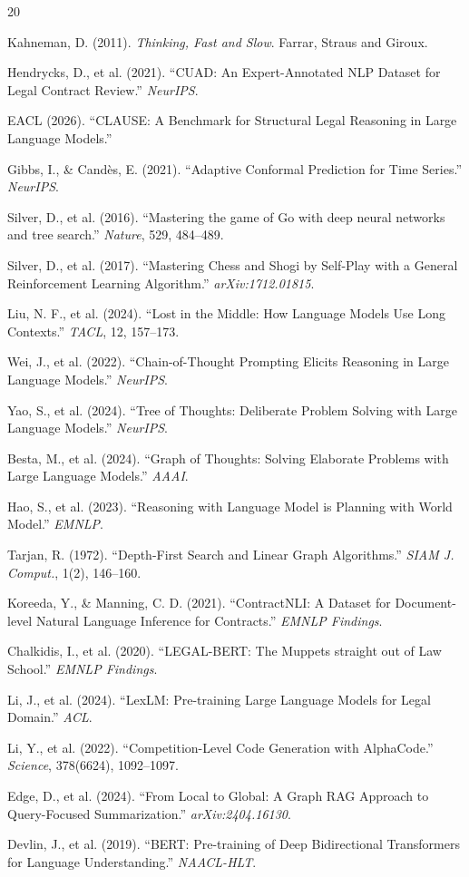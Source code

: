\documentclass{article}
\begin{document}

\begin{thebibliography}{20}

 Kahneman, D. (2011). \textit{Thinking, Fast and Slow}. Farrar, Straus and Giroux.

 Hendrycks, D., et al. (2021). ``CUAD: An Expert-Annotated NLP Dataset for Legal Contract Review.'' \textit{NeurIPS}.

 EACL (2026). ``CLAUSE: A Benchmark for Structural Legal Reasoning in Large Language Models.''

 Gibbs, I., \& Cand\`{e}s, E. (2021). ``Adaptive Conformal Prediction for Time Series.'' \textit{NeurIPS}.

 Silver, D., et al. (2016). ``Mastering the game of Go with deep neural networks and tree search.'' \textit{Nature}, 529, 484--489.

 Silver, D., et al. (2017). ``Mastering Chess and Shogi by Self-Play with a General Reinforcement Learning Algorithm.'' \textit{arXiv:1712.01815}.

 Liu, N. F., et al. (2024). ``Lost in the Middle: How Language Models Use Long Contexts.'' \textit{TACL}, 12, 157--173.

 Wei, J., et al. (2022). ``Chain-of-Thought Prompting Elicits Reasoning in Large Language Models.'' \textit{NeurIPS}.

 Yao, S., et al. (2024). ``Tree of Thoughts: Deliberate Problem Solving with Large Language Models.'' \textit{NeurIPS}.

 Besta, M., et al. (2024). ``Graph of Thoughts: Solving Elaborate Problems with Large Language Models.'' \textit{AAAI}.

 Hao, S., et al. (2023). ``Reasoning with Language Model is Planning with World Model.'' \textit{EMNLP}.

 Tarjan, R. (1972). ``Depth-First Search and Linear Graph Algorithms.'' \textit{SIAM J. Comput.}, 1(2), 146--160.

 Koreeda, Y., \& Manning, C. D. (2021). ``ContractNLI: A Dataset for Document-level Natural Language Inference for Contracts.'' \textit{EMNLP Findings}.

 Chalkidis, I., et al. (2020). ``LEGAL-BERT: The Muppets straight out of Law School.'' \textit{EMNLP Findings}.

 Li, J., et al. (2024). ``LexLM: Pre-training Large Language Models for Legal Domain.'' \textit{ACL}.

 Li, Y., et al. (2022). ``Competition-Level Code Generation with AlphaCode.'' \textit{Science}, 378(6624), 1092--1097.

 Edge, D., et al. (2024). ``From Local to Global: A Graph RAG Approach to Query-Focused Summarization.'' \textit{arXiv:2404.16130}.

 Devlin, J., et al. (2019). ``BERT: Pre-training of Deep Bidirectional Transformers for Language Understanding.'' \textit{NAACL-HLT}.

\end{thebibliography}
\end{document}
